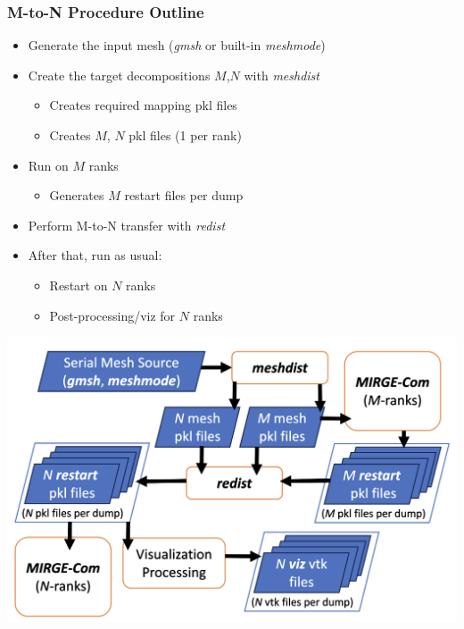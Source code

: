 \begin{frame}\frametitle{M-to-N Procedure Outline}
\begin{minipage}{0.49\textwidth}
\begin{itemize}
\item Generate the input mesh (\textit{gmsh} or built-in \textit{meshmode})
\item Create the target decompositions $M$,$N$ with \textit{meshdist}
  \begin{itemize}
  \item Creates required mapping pkl files
  \item Creates $M$, $N$ pkl files (1 per rank)
  \end{itemize}
\item Run \mirgecom{} on $M$ ranks
\begin{itemize}
\item Generates $M$ restart files per dump
\end{itemize}
\item Perform M-to-N transfer with \textit{redist}
\item After that, run as usual:
  \begin{itemize}
  \item Restart \mirgecom{} on $N$ ranks
  \item Post-processing/viz for $N$ ranks
  \end{itemize}
\end{itemize}
\end{minipage}
\hfill
\begin{minipage}{.49\textwidth}
\includegraphics[width=\textwidth]{Figures/mtc/redist_data_flow_full.png}
\end{minipage}
\end{frame}


